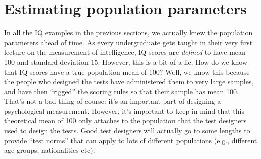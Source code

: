 \section{Estimating population parameters~\label{sec:pointestimates}}

In all the IQ examples in the previous sections, we actually knew the population parameters ahead of time. As every undergraduate gets taught in their very first lecture on the measurement of intelligence, IQ scores are {\it defined} to have mean 100 and standard deviation 15. However, this is a bit of a lie. How do we know that IQ scores have a true population mean of 100? Well, we know this because the people who designed the tests have administered them to very large samples, and have then ``rigged'' the scoring rules so that their sample has mean 100. That's not a bad thing of course: it's an important part of designing a psychological measurement. However, it's important to keep in mind that this theoretical mean of 100 only attaches to the population that the test designers used to design the tests. Good test designers will actually go to some lengths to provide ``test norms'' that can apply to lots of different populations (e.g., different age groups, nationalities etc). 


